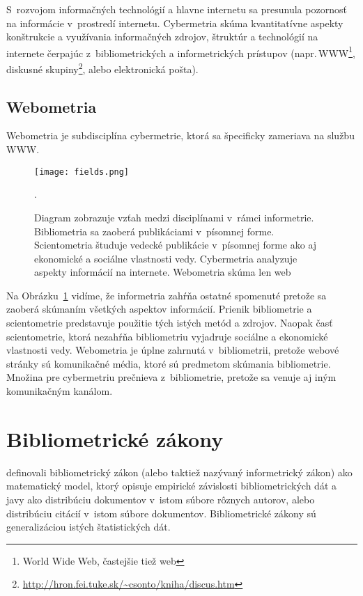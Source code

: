 S~rozvojom informačných technológií a hlavne internetu sa presunula pozornosť na
informácie v~prostredí internetu.  Cybermetria skúma kvantitatívne aspekty
konštrukcie a využívania informačných zdrojov, štruktúr a technológií na
internete čerpajúc z~bibliometrických a informetrických prístupov
(napr.\,WWW\footnote{World Wide Web, častejšie tiež web}, diskusné
skupiny\footnote{\url{http://hron.fei.tuke.sk/~csonto/kniha/discus.htm}}, alebo
elektronická pošta).


\subsection{Webometria}

Webometria je subdisciplína cybermetrie, ktorá sa špecificky zameriava na službu
WWW.

\begin{figure}
  \centering
  \texttt{[image: fields.png]}
  \caption[Vzťah medzi jednotlivými disciplínami v~rámci informetrie]%
  {Diagram zobrazuje vzťah medzi disciplínami v~rámci informetrie.  Bibliometria
    sa zaoberá publikáciami v~písomnej forme.  Scientometria študuje vedecké
    publikácie v~písomnej forme ako aj ekonomické a sociálne vlastnosti
    vedy.  Cybermetria analyzuje aspekty informácií na internete.  Webometria
    skúma len web \citep{Bjorneborn2004}}.
  \label{fig:fields}
\end{figure}

Na Obrázku~\ref{fig:fields} vidíme, že informetria zahŕňa ostatné spomenuté
 pretože sa zaoberá skúmaním všetkých aspektov informácií.  Prienik
bibliometrie a scientometrie predstavuje použitie tých istých metód a zdrojov.
Naopak časť scientometrie, ktorá nezahŕňa bibliometriu vyjadruje sociálne a
ekonomické vlastnosti vedy.  Webometria je úplne zahrnutá v~bibliometrii,
pretože webové stránky sú komunikačné média, ktoré sú predmetom skúmania
bibliometrie.  Množina pre cybermetriu prečnieva z~bibliometrie, pretože sa
venuje aj iným komunikačným kanálom.

\section{Bibliometrické zákony}

\citet{Todeschini2016} definovali bibliometrický zákon (alebo taktiež nazývaný
informetrický zákon) ako matematický model, ktorý opisuje empirické závislosti
bibliometrických dát a javy ako distribúciu dokumentov v~istom súbore rôznych
autorov, alebo distribúciu citácií v~istom súbore dokumentov.  Bibliometrické
zákony sú generalizáciou istých štatistických dát.

